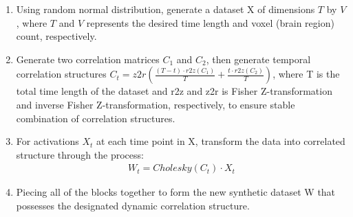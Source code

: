 \documentclass[12pt]{article}
\begin{document}
\begin{enumerate}
\begin{enumerate}
\item Using random normal distribution, generate a dataset X of dimensions $T$ by $V$, where $T$ and $V$ represents the desired time length and voxel (brain region) count, respectively.
\item Generate two correlation matrices $C_1$ and $C_2$, then generate temporal correlation structures $C_t = z2r(\frac{(T-t) \cdot r2z(C_1)}{T} + \frac{t\cdot r2z(C_2)}{T})$, where T is the total time length of the dataset and r2z and z2r is Fisher Z-transformation and inverse Fisher Z-transformation, respectively, to ensure stable combination of correlation structures.
\item For activations $X_t$ at each time point in X, transform the data into correlated structure through the process:
\begin{align*}
W_t = Cholesky(C_t) \cdot X_t
\end{align*}
\item Piecing all of the blocks together to form the new synthetic dataset W that possesses the designated dynamic correlation structure.
\end{enumerate}
\end{enumerate}
\end{document}
